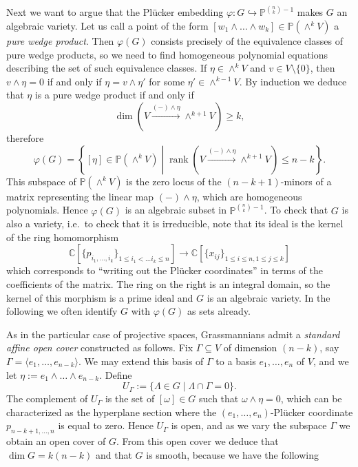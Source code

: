 \documentclass[12pt,a4paper]{amsart}
\theoremstyle{plain}
\theoremstyle{definition}
\theoremstyle{remark}
\begin{document}
Next we want to argue that the Plücker embedding $\varphi\colon G\hookrightarrow \mathbb{P}^{\binom{n}{k}-1}$ makes $G$ an algebraic variety.
Let us call a point of the form $[w_{1}\wedge\ldots \wedge w_{k}]\in \mathbb{P}(\wedge^{k}V)$ a \textit{pure wedge product}.
Then $\varphi(G)$ consists precisely of the equivalence classes of pure wedge products, so we need to find homogeneous polynomial equations describing the set of such equivalence classes.
If $\eta\in \wedge^{k}V$ and $v\in V\setminus \{0\}$, then $v\wedge \eta=0$ if and only if $\eta=v\wedge \eta'$ for some $\eta'\in \wedge^{k-1}V$.
By induction we deduce that $\eta$ is a pure wedge product if and only if
\[ \dim\left(V\xrightarrow{(-)\wedge\eta}\wedge^{k+1}V\right)\geq k, \]
therefore
\[ \varphi(G)=\left\{ [\eta]\in \mathbb{P}(\wedge^{k}V) \middle| \operatorname{rank}\left(V\xrightarrow{(-)\wedge \eta} \wedge^{k+1}V\right) \leq n-k \right\}. \]
This subspace of $\mathbb{P}(\wedge^{k}V)$ is the zero locus of the $(n-k+1)$-minors of a matrix representing the linear map $(-)\wedge \eta$, which are homogeneous polynomials.
Hence $\varphi(G)$ is an algebraic subset in $\mathbb{P}^{\binom{n}{k}-1}$.
To check that $G$ is also a variety, i.e.~to check that it is irreducible, note that its ideal is the kernel of the ring homomorphism
\[ \mathbb{C}[\{p_{i_{1},\ldots,i_{k}}\}_{1\leq i_{1}<\ldots i_{k}\leq n}] \longrightarrow \mathbb{C}[\{ x_{ij}\}_{1\leq i\leq n,1\leq j\leq k}] \]
which corresponds to ``writing out the Pl\"{u}cker coordinates'' in terms of the coefficients of the matrix.
The ring on the right is an integral domain, so the kernel of this morphism is a prime ideal and $G$ is an algebraic variety.
In the following we often identify $G$ with $\varphi(G)$ as sets already.

As in the particular case of projective spaces, Grassmannians admit a \textit{standard affine open cover} constructed as follows.
Fix $\Gamma \subseteq V$ of dimension $(n-k)$, say $\Gamma=\langle e_{1},\ldots,e_{n-k}\rangle$.
We may extend this basis of $\Gamma$ to a basis $e_{1},\ldots,e_{n}$ of $V$, and we let $\eta:=e_{1}\wedge\ldots \wedge e_{n-k}$.
Define
\[ U_{\Gamma}:=\{ \Lambda\in G\mid \Lambda\cap \Gamma = 0\}. \]
The complement of $U_{\Gamma}$ is the set of $[\omega]\in G$ such that $\omega\wedge \eta=0$, which can be characterized as the hyperplane section where the $(e_{1},\ldots,e_{n})$-Pl\"{u}cker coordinate $p_{n-k+1,\ldots,n}$ is equal to zero.
Hence $U_{\Gamma}$ is open, and as we vary the subspace $\Gamma$ we obtain an open cover of $G$.
From this open cover we deduce that $\dim{G}=k(n-k)$ and that $G$ is smooth, because we have the following
\end{document}
